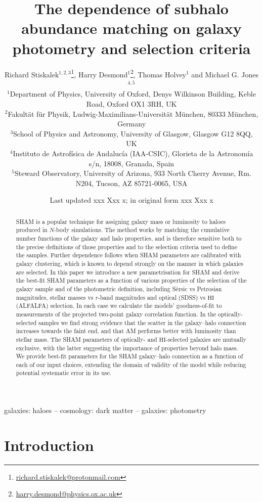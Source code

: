 \documentclass[usenatbib,useAMS]{mnras}
\title[Dependence of AM on photometry and selection]
{The dependence of subhalo abundance matching on galaxy photometry and selection criteria}
\author[R.~Stiskalek, H.~Desmond, T.~Holvey and M.~G.~Jones]
{Richard Stiskalek$^{1, 2, 3}$\thanks{\href{mailto:richard.stiskalek@protonmail.com}{richard.stiskalek@protonmail.com}},
Harry Desmond$^1$\thanks{\href{mailto:harry.desmond@physics.ox.ac.uk}{harry.desmond@physics.ox.ac.uk}},
Thomas Holvey$^1$ and Michael G. Jones$^{4, 5}$
\\
$^{1}$Department of Physics, University of Oxford, Denys Wilkinson Building, Keble Road, Oxford OX1 3RH, UK\\
$^{2}$Fakultät für Physik, Ludwig-Maximilians-Universität München, 80333 München, Germany\\
$^{3}$School of Physics and Astronomy, University of Glasgow, Glasgow G12 8QQ, UK\\
$^{4}$Instituto de Astrofísica de Andalucía (IAA-CSIC), Glorieta de la Astronomía s/n, 18008, Granada, Spain\\
$^{5}$Steward Observatory, University of Arizona, 933 North Cherry Avenue, Rm. N204, Tucson, AZ 85721-0065, USA
}
\date{Last updated xxx Xxx x; in original form xxx Xxx x}
\newcommand{\HI}{\ensuremath{\mathrm{H}\scriptstyle\mathrm{I}}}
\begin{document}
\label{firstpage}
\pagerange{\pageref{firstpage}--\pageref{lastpage}}
\maketitle

\begin{abstract}
\Ac{SHAM} is a popular technique for assigning galaxy mass or luminosity to haloes produced in $N$-body simulations. The method works by matching the cumulative number functions of the galaxy and halo properties, and is therefore sensitive both to the precise definitions of those properties and to the selection criteria used to define the samples. Further dependence follows when \ac{SHAM} parameters are calibrated with galaxy clustering, which is known to depend strongly on the manner in which galaxies are selected. In this paper we introduce a new parametrisation for \ac{SHAM} and derive the best-fit \ac{SHAM} parameters as a function of various properties of the selection of the galaxy sample and of the photometric definition, including S\'{e}rsic vs Petrosian magnitudes, stellar masses vs $r$-band magnitudes and optical (SDSS) vs $\HI$ (ALFALFA) selection. In each case we calculate the models' goodness-of-fit to measurements of the projected two-point galaxy correlation function. In the optically-selected samples we find strong evidence that the scatter in the galaxy--halo connection increases towards the faint end, and that AM performs better with luminosity than stellar mass. The \ac{SHAM} parameters of optically- and $\HI$-selected galaxies are mutually exclusive, with the latter suggesting the importance of properties beyond halo mass. We provide best-fit parameters for the \ac{SHAM} galaxy--halo connection as a function of each of our input choices, extending the domain of validity of the model while reducing potential systematic error in its use.
\end{abstract}

\begin{keywords}
galaxies: haloes -- cosmology: dark matter -- galaxies: photometry
\end{keywords}

\begingroup
\let\clearpage\relax
\endgroup
\newpage


\section{Introduction}
\end{document}
